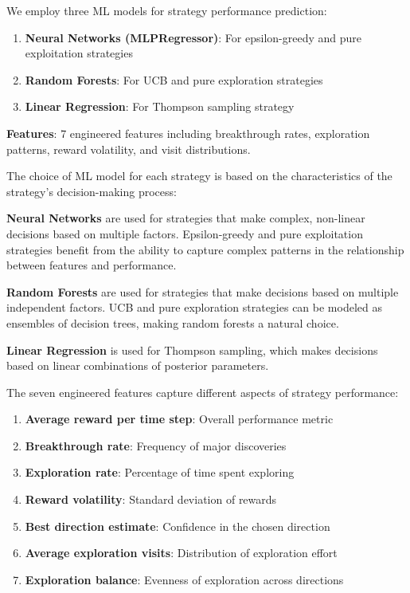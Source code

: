 \documentclass[letterpaper]{article}
\begin{document}
We employ three ML models for strategy performance prediction:

\begin{enumerate}
\item \textbf{Neural Networks (MLPRegressor)}: For epsilon-greedy and pure exploitation strategies
\item \textbf{Random Forests}: For UCB and pure exploration strategies  
\item \textbf{Linear Regression}: For Thompson sampling strategy
\end{enumerate}

\textbf{Features}: 7 engineered features including breakthrough rates, exploration patterns, reward volatility, and visit distributions.

The choice of ML model for each strategy is based on the characteristics of the strategy's decision-making process:

\textbf{Neural Networks} are used for strategies that make complex, non-linear decisions based on multiple factors. Epsilon-greedy and pure exploitation strategies benefit from the ability to capture complex patterns in the relationship between features and performance.

\textbf{Random Forests} are used for strategies that make decisions based on multiple independent factors. UCB and pure exploration strategies can be modeled as ensembles of decision trees, making random forests a natural choice.

\textbf{Linear Regression} is used for Thompson sampling, which makes decisions based on linear combinations of posterior parameters.

The seven engineered features capture different aspects of strategy performance:

\begin{enumerate}
\item \textbf{Average reward per time step}: Overall performance metric
\item \textbf{Breakthrough rate}: Frequency of major discoveries
\item \textbf{Exploration rate}: Percentage of time spent exploring
\item \textbf{Reward volatility}: Standard deviation of rewards
\item \textbf{Best direction estimate}: Confidence in the chosen direction
\item \textbf{Average exploration visits}: Distribution of exploration effort
\item \textbf{Exploration balance}: Evenness of exploration across directions
\end{enumerate}
\end{document}
